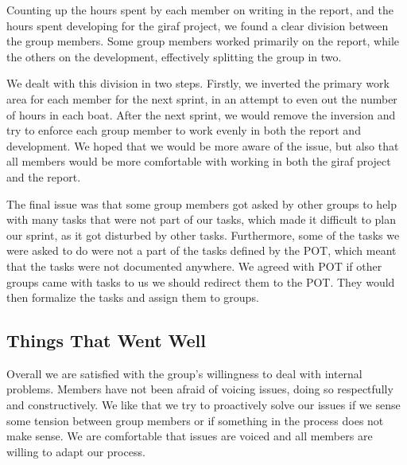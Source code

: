 Counting up the hours spent by each member on writing in the report, and the hours spent developing for the \gls{giraf} project, we found a clear division between the group members. Some group members worked primarily on the report, while the others on the development, effectively splitting the group in two. 

We dealt with this division in two steps. Firstly, we inverted the primary work area for each member for the next sprint, in an attempt to even out the number of hours in each boat. After the next sprint, we would remove the inversion and try to enforce each group member to work evenly in both the report and development. We hoped that we would be more aware of the issue, but also that all members would be more comfortable with working in both the \gls{giraf} project and the report.

The final issue was that some group members got asked by other groups to help with many tasks that were not part of our tasks, which made it difficult to plan our sprint, as it got disturbed by other tasks. Furthermore, some of the tasks we were asked to do were not a part of the tasks defined by the \gls{POT}, which meant that the tasks were not documented anywhere. We agreed with \gls{POT} if other groups came with tasks to us we should redirect them to the \gls{POT}. They would then formalize the tasks and assign them to groups.

\subsection{Things That Went Well}

Overall we are satisfied with the group's willingness to deal with internal problems. Members have not been afraid of voicing issues, doing so respectfully and constructively. We like that we try to proactively solve our issues if we sense some tension between group members or if something in the process does not make sense. We are comfortable that issues are voiced and all members are willing to adapt our process.